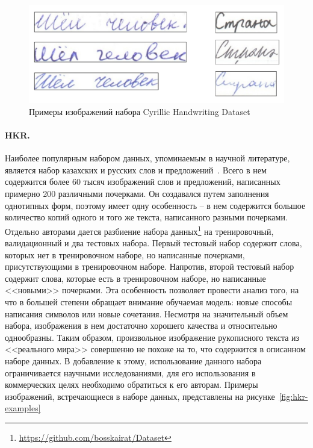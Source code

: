 \begin{figure}[h!]
    \centering
    \includegraphics[width=\textwidth]{img/cyrillic}
    \caption{Примеры изображений набора Cyrillic Handwriting Dataset}
    \label{fig:cyrillic-examples}
\end{figure}

\paragraph{HKR.}{Наиболее популярным набором данных, упоминаемым в научной литературе, является набор казахских и русских слов и предложений~\cite{nurseitov2021handwritten}.
Всего в нем содержится более 60 тысяч изображений слов и предложений, написанных примерно 200 различными почерками.
Он создавался путем заполнения однотипных форм, поэтому имеет одну особенность -- в нем содержится большое количество копий одного и того же текста, написанного разными почерками.
Отдельно авторами дается разбиение набора данных\footnote{\url{https://github.com/bosskairat/Dataset}} на тренировочный, валидационный и два тестовых набора.
Первый тестовый набор содержит слова, которых нет в тренировочном наборе, но написанные почерками, присутствующими в тренировочном наборе.
Напротив, второй тестовый набор содержит слова, которые есть в тренировочном наборе, но написанные <<новыми>> почерками.
Эта особенность позволяет провести анализ того, на что в большей степени обращает внимание обучаемая модель: новые способы написания символов или новые сочетания.
Несмотря на значительный объем набора, изображения в нем достаточно хорошего качества и относительно однообразны.
Таким образом, произвольное изображение рукописного текста из <<реального мира>> совершенно не похоже на то, что содержится в описанном наборе данных.
В добавление к этому, использование данного набора ограничивается научными исследованиями, для его использования в коммерческих целях необходимо обратиться к его авторам.
Примеры изображений, встречающиеся в наборе данных, представлены на рисунке~\ref{fig:hkr-examples}}

